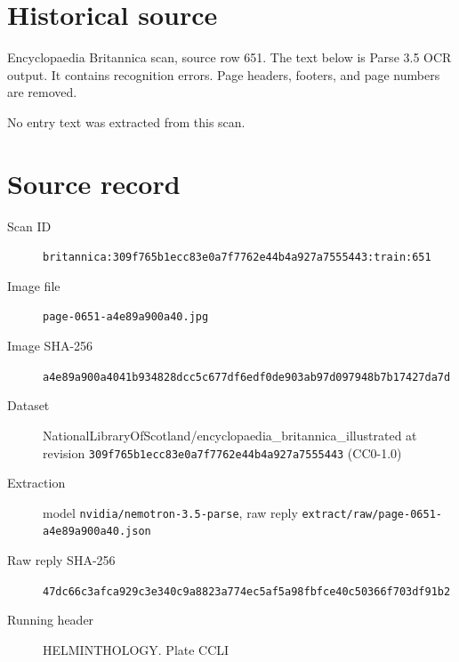\documentclass{article}
\begin{document}
\section*{Historical source}
Encyclopaedia Britannica scan, source row 651. The text below is Parse 3.5 OCR output. It contains recognition errors.
Page headers, footers, and page numbers are removed.

No entry text was extracted from this scan.

\section*{Source record}
\begin{description}
\item[Scan ID] \texttt{britannica:309f765b1ecc83e0a7f7762e44b4a927a7555443:train:651}
\item[Image file] \texttt{page-0651-a4e89a900a40.jpg}
\item[Image SHA-256] \texttt{a4e89a900a4041b934828dcc5c677df6edf0de903ab97d097948b7b17427da7d}
\item[Dataset] NationalLibraryOfScotland/encyclopaedia\_britannica\_illustrated at revision \texttt{309f765b1ecc83e0a7f7762e44b4a927a7555443} (CC0-1.0)
\item[Extraction] model \texttt{nvidia/nemotron-3.5-parse}, raw reply \texttt{extract/raw/page-0651-a4e89a900a40.json}
\item[Raw reply SHA-256] \texttt{47dc66c3afca929c3e340c9a8823a774ec5af5a98fbfce40c50366f703df91b2}

\item[Running header] HELMINTHOLOGY. Plate CCLI
\end{description}
\end{document}
